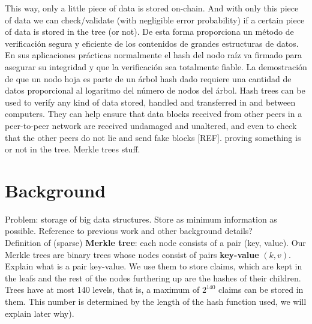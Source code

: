 \documentclass[11pt]{article}
\begin{document}
This way, only a little piece of data is stored on-chain. And with only this piece of data we can check/validate (with negligible error probability) if a certain piece of data is stored in the tree (or not). 
De esta forma proporciona un método de verificación segura y eficiente de los contenidos de grandes estructuras de datos. En sus aplicaciones prácticas normalmente el hash del nodo raíz va firmado para asegurar su integridad y que la verificación sea totalmente fiable. La demostración de que un nodo hoja es parte de un árbol hash dado requiere una cantidad de datos proporcional al logaritmo del número de nodos del árbol.
Hash trees can be used to verify any kind of data stored, handled and transferred in and between computers. They can help ensure that data blocks received from other peers in a peer-to-peer network are received undamaged and unaltered, and even to check that the other peers do not lie and send fake blocks [REF]. proving something is or not in the tree. Merkle trees stuff.



%

	
\section{Background}				

Problem: storage of big data structures. Store as minimum information as possible. Reference to previous work and other background details? \\

Definition of (sparse) {\bf Merkle tree}: each node consists of a pair (key, value). Our Merkle trees are binary trees %
whose nodes consist of pairs {\bf key-value} $(k,v)$. Explain what is a pair key-value. We use them to store claims, which are kept in the leafs and the rest of the nodes furthering up are the hashes of their children. 
Trees have at most 140 levels, that is, a maximum of $2^140$ claims can be stored in them. This number is determined by the length of the hash function used, we will explain later why).\\
\end{document}

